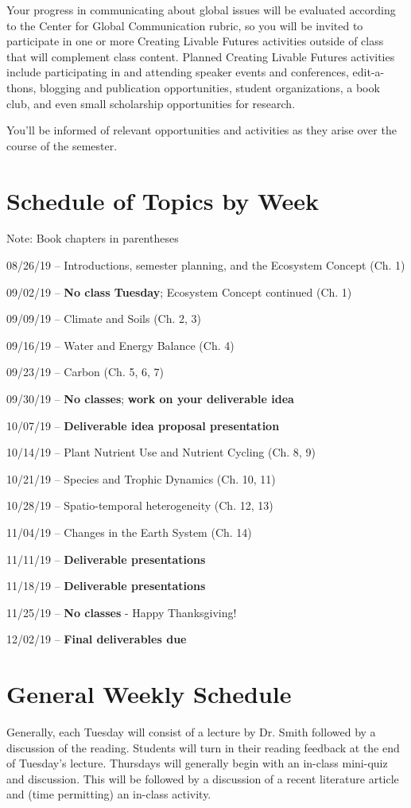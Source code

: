 \documentclass[12pt, notitlepage]{article}   	%
\begin{document}
{Your progress in communicating about global issues will be evaluated according to the 
Center for Global Communication rubric, so you will be invited to participate 
in one or more Creating Livable Futures activities outside of class that will 
complement class content. 
Planned Creating Livable Futures activities include participating in and attending 
speaker events and conferences, edit-a-thons, blogging and publication opportunities, 
student organizations, a book club, and even small scholarship opportunities for research. 

You’ll be informed of relevant opportunities and activities as they arise over 
the course of the semester.

\newpage

\section*{Schedule of Topics by Week}
Note: Book chapters in parentheses \par
08/26/19 – Introductions, semester planning, and the Ecosystem Concept (Ch. 1) \par
09/02/19 – \textbf{No class Tuesday}; Ecosystem Concept continued (Ch. 1) \par
09/09/19 – Climate and Soils (Ch. 2, 3) \par
09/16/19 – Water and Energy Balance (Ch. 4) \par
09/23/19 – Carbon (Ch. 5, 6, 7) \par
09/30/19 – \textbf{No classes}; \textbf{work on your deliverable idea} \par
10/07/19 – \textbf{Deliverable idea proposal presentation} \par
10/14/19 – Plant Nutrient Use and Nutrient Cycling (Ch. 8, 9) \par
10/21/19 – Species and Trophic Dynamics (Ch. 10, 11) \par
10/28/19 – Spatio-temporal heterogeneity (Ch. 12, 13) \par
11/04/19 – Changes in the Earth System (Ch. 14) \par
11/11/19 – \textbf{Deliverable presentations} \par
11/18/19 – \textbf{Deliverable presentations} \par
11/25/19 – \textbf{No classes} - Happy Thanksgiving! \par
12/02/19 – \textbf{Final deliverables due} \par

\section*{General Weekly Schedule}
Generally, each Tuesday will consist of a lecture by Dr. Smith followed by a discussion
of the reading. Students will turn in their reading
feedback at the end of Tuesday's lecture. Thursdays will generally begin with an in-class
mini-quiz and discussion. 
This will be followed by a discussion of a recent literature article and
(time permitting) an in-class activity.

} %
\end{document}
